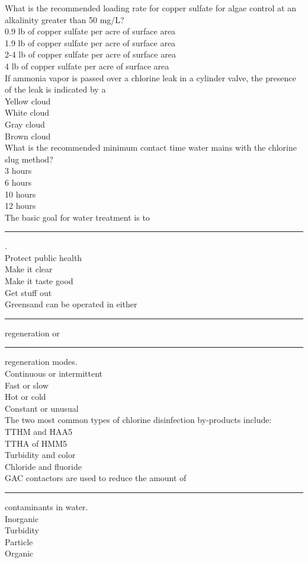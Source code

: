 What is the recommended loading rate for copper sulfate for algae control at an alkalinity greater than 50 mg/L?\\
0.9 lb of copper sulfate per acre of surface area\\
1.9 lb of copper sulfate per acre of surface area\\
2-4 lb of copper sulfate per acre of surface area\\
4 lb of copper sulfate per acre of surface area\\
If ammonia vapor is passed over a chlorine leak in a cylinder valve, the presence of the leak is indicated by a\\
Yellow cloud\\
White cloud\\
Gray cloud\\
Brown cloud\\
What is the recommended minimum contact time water mains with the chlorine slug method?\\
3 hours\\
6 hours\\
10 hours\\
12 hours\\
The basic goal for water treatment is to \rule{2cm}{0.3pt}.\\
Protect public health\\
Make it clear\\
Make it taste good\\
Get stuff out\\
Greensand can be operated in either \rule{2cm}{0.5pt} regeneration or \rule{2cm}{0.5pt} regeneration modes.\\
Continuous or intermittent\\
Fast or slow\\
Hot or cold\\
Constant or unusual\\
The two most common types of chlorine disinfection by-products include:\\
TTHM and HAA5\\
TTHA of HMM5\\
Turbidity and color\\
Chloride and fluoride\\
GAC contactors are used to reduce the amount of \rule{2cm}{0.5pt} contaminants in water.\\
Inorganic\\
Turbidity\\
Particle\\
Organic\\

